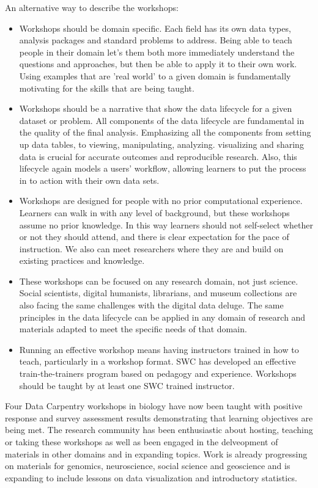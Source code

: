 \documentclass[15]{idcc}
\begin{document}
An alternative way to describe the workshops:
\begin{itemize}
\item Workshops should be domain specific. Each field has its own data types, analysis packages and standard problems to address. Being able to teach people in their domain let’s them both more immediately understand the questions and approaches, but then be able to apply it to their own work. Using examples that are 'real world' to a given domain is fundamentally motivating for the skills that are being taught.

\item Workshops should be a narrative that show the data lifecycle for a given dataset or problem. All components of the data lifecycle are fundamental in the quality of the final analysis. Emphasizing all the components from setting up data tables, to viewing, manipulating, analyzing. visualizing and sharing data is crucial for accurate outcomes and reproducible research. Also, this lifecycle again models a users' workflow, allowing learners to put the process in to action with their own data sets.

\item Workshops are designed for people with no prior computational experience. Learners can walk in with any level of background, but these workshops assume no prior knowledge. In this way learners should not self-select whether or not they should attend, and there is clear expectation for the pace of instruction. We also can meet researchers where they are and build on existing practices and knowledge.

\item These workshops can be focused on any research domain, not just science. Social scientists, digital humanists, librarians, and museum collections are also facing the same challenges with the digital data deluge. The same principles in the data lifecycle can be applied in any domain of research and materials adapted to meet the specific needs of that domain.

\item Running an effective workshop means having instructors trained in how to teach, particularly in a workshop format. SWC has developed an effective train-the-trainers program based on pedagogy and experience. Workshops should be taught by at least one SWC trained instructor.

\end{itemize}

Four Data Carpentry workshops in biology have now been taught with positive response and survey assessment results demonstrating that learning objectives are being met. The research community has been enthusiastic about hosting, teaching or taking these workshops as well as been engaged in the delveopment of materials in other domains and in expanding topics. Work is already progressing on materials for genomics, neuroscience, social science and geoscience and is expanding to include lessons on data visualization and introductory statistics.
\end{document}
